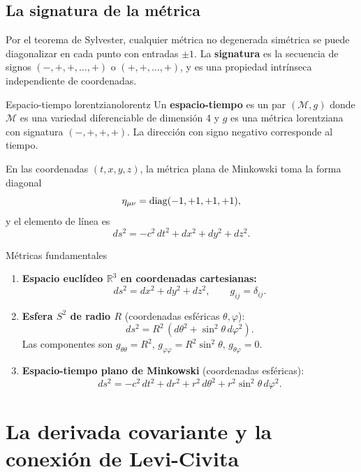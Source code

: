 \subsection{La signatura de la métrica}

Por el teorema de Sylvester, cualquier métrica no degenerada simétrica se puede diagonalizar en cada punto con entradas $\pm 1$. La \textbf{signatura} es la secuencia de signos $(-, +, +, \ldots, +)$ o $(+,+,\ldots, +)$, y es una propiedad intrínseca independiente de coordenadas.

\begin{definicion}{Espacio-tiempo lorentziano}{lorentz}
Un \textbf{espacio-tiempo} es un par $(\mathcal{M}, g)$ donde $\mathcal{M}$ es una variedad diferenciable de dimensión 4 y $g$ es una métrica lorentziana con signatura $(-,+,+,+)$. La dirección con signo negativo corresponde al tiempo.
\end{definicion}

En las coordenadas $(t,x,y,z)$, la métrica plana de Minkowski toma la forma diagonal
\begin{equation}
  \eta_{\mu\nu} = \mathrm{diag}(-1,+1,+1,+1),
  \label{eq:mink}
\end{equation}
y el elemento de línea es
\[
  ds^2 = -c^2\, dt^2 + dx^2 + dy^2 + dz^2.
\]

\begin{ejemplo}{Métricas fundamentales}{}
\begin{enumerate}[leftmargin=2em, label=(\alph*)]
  \item \textbf{Espacio euclídeo $\mathbb{R}^3$ en coordenadas cartesianas:}
  \[
    ds^2 = dx^2 + dy^2 + dz^2, \qquad g_{ij} = \delta_{ij}.
  \]

  \item \textbf{Esfera $S^2$ de radio $R$} (coordenadas esféricas $\theta, \varphi$):
  \[
    ds^2 = R^2\,(d\theta^2 + \sin^2\theta\, d\varphi^2).
  \]
  Las componentes son $g_{\theta\theta} = R^2$, $g_{\varphi\varphi} = R^2\sin^2\theta$, $g_{\theta\varphi} = 0$.

  \item \textbf{Espacio-tiempo plano de Minkowski} (coordenadas esféricas):
  \[
    ds^2 = -c^2\,dt^2 + dr^2 + r^2\,d\theta^2 + r^2\sin^2\theta\,d\varphi^2.
  \]
\end{enumerate}
\end{ejemplo}

\section{La derivada covariante y la conexión de Levi-Civita}
\label{sec:covd}

